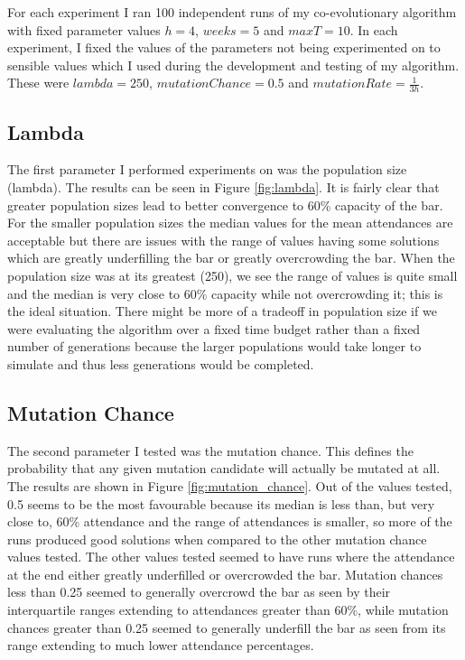 \documentclass[11pt]{article}
\begin{document}
For each experiment I ran 100 independent runs of my co-evolutionary algorithm with fixed parameter values $h = 4$, $weeks = 5$ and $maxT = 10$.
In each experiment, I fixed the values of the parameters not being experimented on to sensible values which I used during the development and testing of my algorithm.
These were $lambda = 250$, $mutationChance = 0.5$ and $mutationRate = \frac{1}{3h}$.

\subsection{Lambda}

The first parameter I performed experiments on was the population size (lambda).
The results can be seen in Figure \ref{fig:lambda}.
It is fairly clear that greater population sizes lead to better convergence to 60\% capacity of the bar.
For the smaller population sizes the median values for the mean attendances are acceptable but there are issues with the range of values having some solutions which are greatly underfilling the bar or greatly overcrowding the bar.
When the population size was at its greatest (250), we see the range of values is quite small and the median is very close to 60\% capacity while not overcrowding it; this is the ideal situation.
There might be more of a tradeoff in population size if we were evaluating the algorithm over a fixed time budget rather than a fixed number of generations because the larger populations would take longer to simulate and thus less generations would be completed.

\subsection{Mutation Chance}

The second parameter I tested was the mutation chance.
This defines the probability that any given mutation candidate will actually be mutated at all.
The results are shown in Figure \ref{fig:mutation_chance}.
Out of the values tested, 0.5 seems to be the most favourable because its median is less than, but very close to, 60\% attendance and the range of attendances is smaller, so more of the runs produced good solutions when compared to the other mutation chance values tested.
The other values tested seemed to have runs where the attendance at the end either greatly underfilled or overcrowded the bar.
Mutation chances less than 0.25 seemed to generally overcrowd the bar as seen by their interquartile ranges extending to attendances greater than 60\%, while mutation chances greater than 0.25 seemed to generally underfill the bar as seen from its range extending to much lower attendance percentages.
\end{document}
